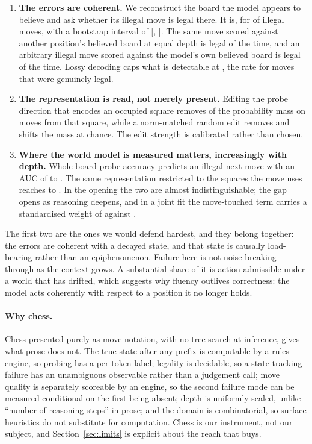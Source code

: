 \documentclass[manuscript, screen, review]{jair}
\theoremstyle{remark}
\begin{document}
\begin{enumerate}[nosep]
\item \textbf{The errors are coherent.} We reconstruct the board the model
appears to believe and ask whether its illegal move is legal there. It is, for
 of illegal moves, with a bootstrap interval of
[, ]. The same move scored against
another position's believed board at equal depth is legal  of
the time, and an arbitrary illegal move scored against the model's own believed
board is legal  of the time. Lossy decoding caps what is
detectable at , the rate for moves that were genuinely legal.
\item \textbf{The representation is read, not merely present.} Editing the probe
direction that encodes an occupied square removes  of the
probability mass on moves from that square, while a norm-matched random edit
removes  and shifts the mass at chance. The edit
strength is calibrated rather than chosen.
\item \textbf{Where the world model is measured matters, increasingly with
depth.} Whole-board probe accuracy predicts an illegal next move with an AUC of
 to . The same representation restricted to
the squares the move uses reaches  to . In
the opening the two are almost indistinguishable; the gap opens as reasoning
deepens, and in a joint fit the move-touched term carries a standardised
weight of  against .
\end{enumerate}

The first two are the ones we would defend hardest, and they belong together:
the errors are coherent with a decayed state, and that state is causally
load-bearing rather than an epiphenomenon. Failure here is not noise breaking
through as the context grows. A substantial share of it is action admissible under a
world that has drifted, which suggests why fluency outlives correctness: the
model acts coherently with respect to a position it no longer holds.

\paragraph{Why chess.}
Chess presented purely as move notation, with no tree search at inference, gives
what prose does not. The true state after any prefix is computable by a rules
engine, so probing has a per-token label; legality is decidable, so a
state-tracking failure has an unambiguous observable rather than a judgement
call; move quality is separately scoreable by an engine, so the second failure
mode can be measured conditional on the first being absent; depth is uniformly
scaled, unlike ``number of reasoning steps'' in prose; and the domain is
combinatorial, so surface heuristics do not substitute for computation. Chess is
our instrument, not our subject, and Section~\ref{sec:limits} is explicit about
the reach that buys.
\end{document}
